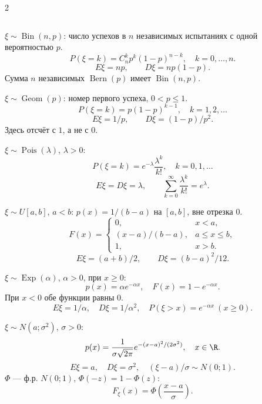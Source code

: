 \documentclass[a4paper,10pt]{article}
\begin{document}
\begin{multicols}{2}
\begin{definition}
\[\]
\end{definition}
\begin{definition}
$\xi\sim\operatorname{Bin}(n,p)$: число успехов в $n$ независимых испытаниях с одной вероятностью $p$.
\[
P(\xi=k)=C_n^kp^k(1-p)^{n-k},\quad k=0,\ldots,n.
\]
\[
E\xi=np,\qquad D\xi=np(1-p).
\]
Сумма $n$ независимых $\operatorname{Bern}(p)$ имеет $\operatorname{Bin}(n,p)$.
\end{definition}
\begin{definition}
$\xi\sim\operatorname{Geom}(p)$: номер первого успеха, $0<p\le1$.
\[
P(\xi=k)=p(1-p)^{k-1},\quad k=1,2,\ldots
\]
\[
E\xi=1/p,\qquad D\xi=(1-p)/p^2.
\]
Здесь отсчёт с $1$, а не с $0$.
\end{definition}
\begin{definition}
$\xi\sim\operatorname{Pois}(\lambda)$, $\lambda>0$:
\[
P(\xi=k)=e^{-\lambda}\frac{\lambda^k}{k!},\quad k=0,1,\ldots
\]
\[
E\xi=D\xi=\lambda,\qquad \sum_{k=0}^{\infty}\frac{\lambda^k}{k!}=e^\lambda.
\]
\end{definition}
\begin{definition}
$\xi\sim U[a,b]$, $a<b$: $p(x)=1/(b-a)$ на $[a,b]$, вне отрезка $0$.
\[
F(x)=\begin{cases}0,&x<a,\\(x-a)/(b-a),&a\le x\le b,\\1,&x>b.\end{cases}
\]
\[
E\xi=(a+b)/2,\qquad D\xi=(b-a)^2/12.
\]
\end{definition}
\begin{definition}
$\xi\sim\operatorname{Exp}(\alpha)$, $\alpha>0$, при $x\ge0$:
\[
p(x)=\alpha e^{-\alpha x},\quad F(x)=1-e^{-\alpha x}.
\]
При $x<0$ обе функции равны $0$.
\[
E\xi=1/\alpha,\quad D\xi=1/\alpha^2,\quad
P(\xi>x)=e^{-\alpha x}\ (x\ge0).
\]
\end{definition}
\begin{definition}
$\xi\sim N(a;\sigma^2)$, $\sigma>0$:
\[
p(x)=\frac1{\sigma\sqrt{2\pi}}e^{-(x-a)^2/(2\sigma^2)},\quad x\in\R.
\]
\[
E\xi=a,\quad D\xi=\sigma^2,\quad (\xi-a)/\sigma\sim N(0;1).
\]
$\Phi$ --- ф.р. $N(0;1)$, $\Phi(-z)=1-\Phi(z)$:
\[
F_\xi(x)=\Phi\!\left(\frac{x-a}{\sigma}\right).
\]
\end{definition}
\end{multicols}
\newpage
\end{document}

